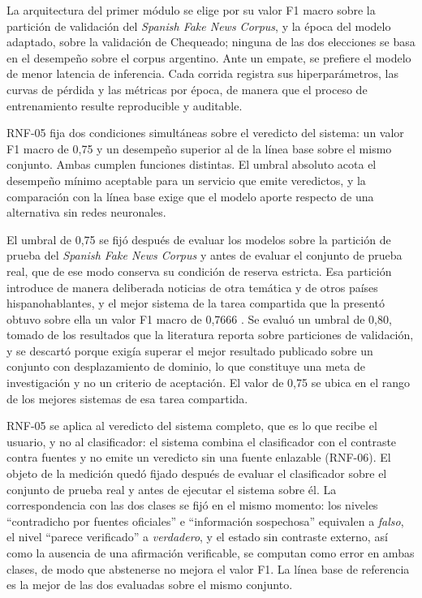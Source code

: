 La arquitectura del primer módulo se elige por su valor F1 macro sobre la partición de validación del \textit{Spanish Fake News Corpus}, y la época del modelo adaptado, sobre la validación de Chequeado; ninguna de las dos elecciones se basa en el desempeño sobre el corpus argentino. Ante un empate, se prefiere el modelo de menor latencia de inferencia. Cada corrida registra sus hiperparámetros, las curvas de pérdida y las métricas por época, de manera que el proceso de entrenamiento resulte reproducible y auditable.

RNF-05 fija dos condiciones simultáneas sobre el veredicto del sistema: un valor F1 macro de 0,75 y un desempeño superior al de la línea base sobre el mismo conjunto. Ambas cumplen funciones distintas. El umbral absoluto acota el desempeño mínimo aceptable para un servicio que emite veredictos, y la comparación con la línea base exige que el modelo aporte respecto de una alternativa sin redes neuronales.

El umbral de 0,75 se fijó después de evaluar los modelos sobre la partición de prueba del \textit{Spanish Fake News Corpus} y antes de evaluar el conjunto de prueba real, que de ese modo conserva su condición de reserva estricta. Esa partición introduce de manera deliberada noticias de otra temática y de otros países hispanohablantes, y el mejor sistema de la tarea compartida que la presentó obtuvo sobre ella un valor F1 macro de 0,7666 \parencite{GomezAdornoEtAl2021}. Se evaluó un umbral de 0,80, tomado de los resultados que la literatura reporta sobre particiones de validación, y se descartó porque exigía superar el mejor resultado publicado sobre un conjunto con desplazamiento de dominio, lo que constituye una meta de investigación y no un criterio de aceptación. El valor de 0,75 se ubica en el rango de los mejores sistemas de esa tarea compartida.

RNF-05 se aplica al veredicto del sistema completo, que es lo que recibe el usuario, y no al clasificador: el sistema combina el clasificador con el contraste contra fuentes y no emite un veredicto sin una fuente enlazable (RNF-06). El objeto de la medición quedó fijado después de evaluar el clasificador sobre el conjunto de prueba real y antes de ejecutar el sistema sobre él. La correspondencia con las dos clases se fijó en el mismo momento: los niveles \enquote{contradicho por fuentes oficiales} e \enquote{información sospechosa} equivalen a \textit{falso}, el nivel \enquote{parece verificado} a \textit{verdadero}, y el estado sin contraste externo, así como la ausencia de una afirmación verificable, se computan como error en ambas clases, de modo que abstenerse no mejora el valor F1. La línea base de referencia es la mejor de las dos evaluadas sobre el mismo conjunto.

